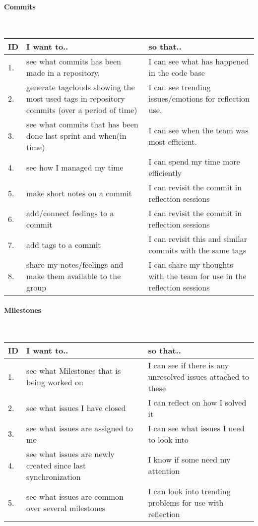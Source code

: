 \paragraph{Commits}\mbox{}\\
\vspace{0.5cm}
 \begin{tabularx}{\linewidth}{| l | X | X |}
    \hline
    \rowcolor[gray]{0.8}
    \textbf{ID} & \textbf{I want to..} & \textbf{so that..} \\
    \hline
    1. & see what commits has been made in a repository. & I can see what has happened in the code base\\
    2. & generate tagclouds showing the most used tags in repository commits (over a period of time) & I can see trending issues/emotions for reflection use.\\
    3. & see what commits that has been done last sprint and when(in time) & I can see when the team was most efficient.\\
    4. & see how I managed my time & I can spend my time more efficiently\\
    5. & make short notes on a commit & I can revisit the commit in reflection sessions\\
    6. & add/connect feelings to a commit & I can revisit the commit in reflection sessions\\
    7. & add tags to a commit & I can revisit this and similar commits with the same tags\\
    8. & share my notes/feelings and make them available to the group & I can share my thoughts with the team for use in the reflection sessions\\
    \hline
\end{tabularx}
\vspace{0.5cm}

\paragraph{Milestones}\mbox{}\\
\vspace{0.5cm}
 \begin{tabularx}{\linewidth}{| l | X | X |}
    \hline
    \rowcolor[gray]{0.8}
    \textbf{ID} & \textbf{I want to..} & \textbf{so that..} \\
    \hline
    1. & see what Milestones that is being worked on & I can see if there is any unresolved issues attached to these\\
    2. & see what issues I have closed & I can reflect on how I solved it\\
    3. & see what issues are assigned to me & I can see what issues I need to look into\\
    4. & see what issues are newly created since last synchronization & I know if some need my attention\\
    5. & see what issues are common over several milestones & I can look into trending problems for use with reflection\\
    \hline
\end{tabularx}
\vspace{0.5cm}

